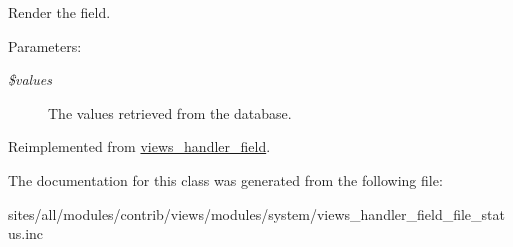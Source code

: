 Render the field.

\begin{Desc}
\item[Parameters:]
\begin{description}
\item[{\em \$values}]The values retrieved from the database. \end{description}
\end{Desc}


Reimplemented from \hyperlink{classviews__handler__field_82ff951c5e9ceb97b2eab86f880cbc1e}{views\_\-handler\_\-field}.

The documentation for this class was generated from the following file:\begin{CompactItemize}
\item 
sites/all/modules/contrib/views/modules/system/views\_\-handler\_\-field\_\-file\_\-status.inc\end{CompactItemize}
